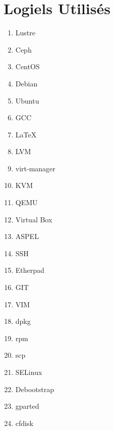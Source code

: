 \documentclass[12pt]{article}
\begin{document}
\section{Logiels Utilisés}
	\begin{enumerate}
	\item{Lustre}
	\item{Ceph}
	\item{CentOS}
	\item{Debian}
	\item{Ubuntu}
	\item{GCC}
	\item{LaTeX}
	\item{LVM}
	\item{virt-manager}
	\item{KVM}
	\item{QEMU}
	\item{Virtual Box}
	\item{ASPEL}
	\item{SSH}
	\item{Etherpad}
	\item{GIT}
	\item{VIM}
	\item{dpkg}
	\item{rpm}
	\item{scp}
	\item{SELinux}
	\item{Debootstrap}
	\item{gparted}
	\item{cfdisk}
\end{enumerate}
\end{document}

